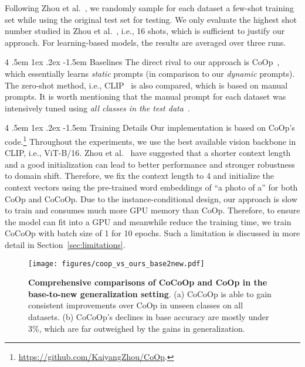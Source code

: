 \documentclass[10pt,twocolumn,letterpaper]{article}
\makeatletter
\renewcommand\paragraph{
  \@startsection{paragraph} {4} {\z@} {.5em \@plus1ex \@minus.2ex} {-1.5em} {\normalfont\normalsize\bfseries} }
\makeatother
\begin{document}
Following Zhou et al.~\cite{zhou2021coop}, we randomly sample for each dataset a few-shot training set while using the original test set for testing. We only evaluate the highest shot number studied in Zhou et al.~\cite{zhou2021coop}, i.e., 16 shots, which is sufficient to justify our approach. For learning-based models, the results are averaged over three runs.

\paragraph{Baselines}
The direct rival to our approach is CoOp~\cite{zhou2021coop}, which essentially learns \emph{static} prompts (in comparison to our \emph{dynamic} prompts). The zero-shot method, i.e., CLIP~\cite{radford2021learning} is also compared, which is based on manual prompts. It is worth mentioning that the manual prompt for each dataset was intensively tuned using \emph{all classes in the test data}~\cite{radford2021learning}.

\paragraph{Training Details}
Our implementation is based on CoOp's code.\footnote{\url{https://github.com/KaiyangZhou/CoOp}.} Throughout the experiments, we use the best available vision backbone in CLIP, i.e., ViT-B/16. Zhou et al.~\cite{zhou2021coop} have suggested that a shorter context length and a good initialization can lead to better performance and stronger robustness to domain shift. Therefore, we fix the context length to 4 and initialize the context vectors using the pre-trained word embeddings of ``a photo of a'' for both CoOp and CoCoOp. Due to the instance-conditional design, our approach is slow to train and consumes much more GPU memory than CoOp. Therefore, to ensure the model can fit into a GPU and meanwhile reduce the training time, we train CoCoOp with batch size of 1 for 10 epochs. Such a limitation is discussed in more detail in Section~\ref{sec:limitations}.


\begin{figure*}[t]
    \centering
    \texttt{[image: figures/coop\_vs\_ours\_base2new.pdf]}
    \caption{\textbf{Comprehensive comparisons of CoCoOp and CoOp in the base-to-new generalization setting}. (a) CoCoOp is able to gain consistent improvements over CoOp in unseen classes on all datasets. (b) CoCoOp's declines in base accuracy are mostly under 3\%, which are far outweighed by the gains in generalization.}
    \label{fig:coop_vs_ours_base2new}
\end{figure*}
\end{document}
